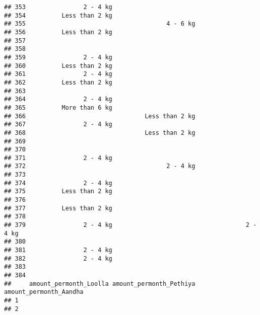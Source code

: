 \documentclass[
]{article}
\begin{document}
\begin{verbatim}
## 353                2 - 4 kg                                             
## 354          Less than 2 kg                                             
## 355                                       4 - 6 kg                      
## 356          Less than 2 kg                                             
## 357                                                                     
## 358                                                                     
## 359                2 - 4 kg                                             
## 360          Less than 2 kg                                             
## 361                2 - 4 kg                                             
## 362          Less than 2 kg                                             
## 363                                                                     
## 364                2 - 4 kg                                             
## 365          More than 6 kg                                             
## 366                                 Less than 2 kg                      
## 367                2 - 4 kg                                             
## 368                                 Less than 2 kg                      
## 369                                                                     
## 370                                                                     
## 371                2 - 4 kg                                             
## 372                                       2 - 4 kg                      
## 373                                                                     
## 374                2 - 4 kg                                             
## 375          Less than 2 kg                                             
## 376                                                                     
## 377          Less than 2 kg                                             
## 378                                                                     
## 379                2 - 4 kg                                     2 - 4 kg
## 380                                                                     
## 381                2 - 4 kg                                             
## 382                2 - 4 kg                                             
## 383                                                                     
## 384                                                                     
##     amount_permonth_Loolla amount_permonth_Pethiya amount_permonth_Aandha
## 1                                                                        
## 2                                                                        

\end{verbatim}
\end{document}
